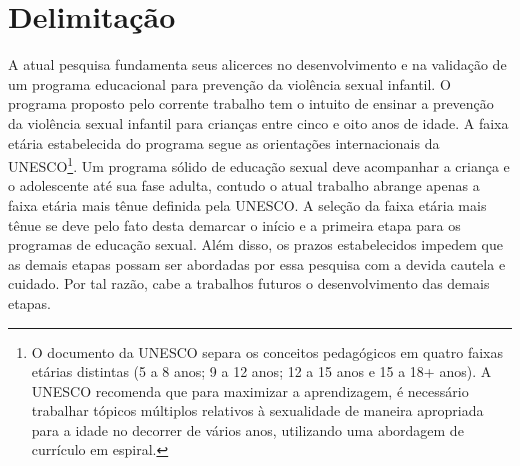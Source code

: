 



\section{Delimitação}\label{sec:Escopo}

A atual pesquisa fundamenta seus alicerces no desenvolvimento e na validação de um programa educacional para prevenção da violência sexual infantil. O programa proposto pelo corrente trabalho tem o intuito de ensinar a prevenção da violência sexual infantil para crianças entre cinco e oito anos de idade. A faixa etária estabelecida do programa segue as orientações internacionais da UNESCO\footnote{O documento da UNESCO separa os conceitos pedagógicos em quatro faixas etárias distintas (5 a 8 anos; 9 a 12 anos; 12 a 15 anos e 15 a 18+ anos). A UNESCO recomenda que para maximizar a aprendizagem, é necessário trabalhar tópicos múltiplos relativos à sexualidade de maneira apropriada para a idade no decorrer de vários anos, utilizando uma abordagem de currículo em espiral.}. Um programa sólido de educação sexual deve acompanhar a criança e o adolescente até sua fase adulta, contudo o atual trabalho abrange apenas a faixa etária mais tênue definida pela UNESCO. A seleção da faixa etária mais tênue se deve pelo fato desta demarcar o início e a primeira etapa para os programas de educação sexual. Além disso, os prazos estabelecidos impedem que as demais etapas possam ser abordadas por essa pesquisa com a devida cautela e cuidado. Por tal razão, cabe a trabalhos futuros o desenvolvimento das demais etapas.

